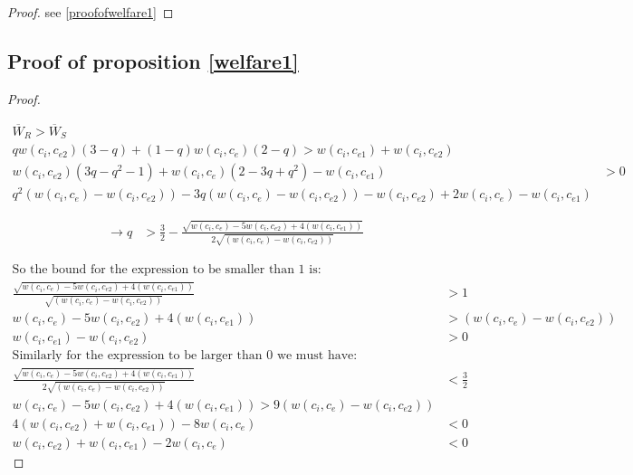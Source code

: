 \documentclass[11pt]{article}
\begin{document}
\begin{proof}
see \ref{proofofwelfare1}
\end{proof}

\subsection{Proof of proposition \ref{welfare1}}

\begin{proof}\label{proofofwelfare1}

\begin{align*}
\overline{W}_R>\overline{W}_S& \\
 q w(c_{i}, c_{e2})(3-q ) 
+(1-q)w(c_{i}, c_{e})(2-q)  
>
w(c_{i}, c_{e1})
+
w(c_{i}, c_{e2})&  \\
w(c_{i}, c_{e2})(3q-q^2-1 ) 
+w(c_{i}, c_{e})(2-3q+q^2) -w(c_{i}, c_{e1}) 
&>
0
\\
q^2(w(c_{i}, c_{e})-w(c_{i}, c_{e2}))
-3q(w(c_{i}, c_{e})-w(c_{i}, c_{e2}))
-w(c_{i}, c_{e2}) 
+2 w(c_{i}, c_{e}) -w(c_{i}, c_{e1})
\end{align*}

\begin{align*}
\rightarrow q &> \frac{3}{2} - \frac{  \sqrt{ w(c_{i}, c_{e})-5w(c_{i}, c_{e2})+4(w(c_{i}, c_{e1}))}}{2\sqrt{(w(c_{i}, c_{e})-w(c_{i}, c_{e2}))}}
\end{align*}

\begin{align*}
\text{So the bound for the expression to be smaller than 1 is:} \\
\frac{  \sqrt{ w(c_{i}, c_{e})-5w(c_{i}, c_{e2})+4(w(c_{i}, c_{e1}))}}{\sqrt{(w(c_{i}, c_{e})-w(c_{i}, c_{e2}))}}  &> 1 \\
 w(c_{i}, c_{e})-5w(c_{i}, c_{e2})+4(w(c_{i}, c_{e1})) & > (w(c_{i}, c_{e})-w(c_{i}, c_{e2})) \\
w(c_{i}, c_{e1})-w(c_{i}, c_{e2})  &> 0 \\
\text{Similarly for the expression to be larger than 0 we must have:} \\
\frac{  \sqrt{ w(c_{i}, c_{e})-5w(c_{i}, c_{e2})+4(w(c_{i}, c_{e1}))}}{2\sqrt{(w(c_{i}, c_{e})-w(c_{i}, c_{e2}))}} &< \frac{3}{2} \\
 w(c_{i}, c_{e})-5w(c_{i}, c_{e2})+4(w(c_{i}, c_{e1})) > 9(w(c_{i}, c_{e})-w(c_{i}, c_{e2})) \\
 4(w(c_{i}, c_{e2})+w(c_{i}, c_{e1}))-8 w(c_{i}, c_{e}) &< 0 \\
 w(c_{i}, c_{e2})+w(c_{i}, c_{e1})-2 w(c_{i}, c_{e}) &< 0
\end{align*}
\end{proof}


\newpage


%


\end{document}
